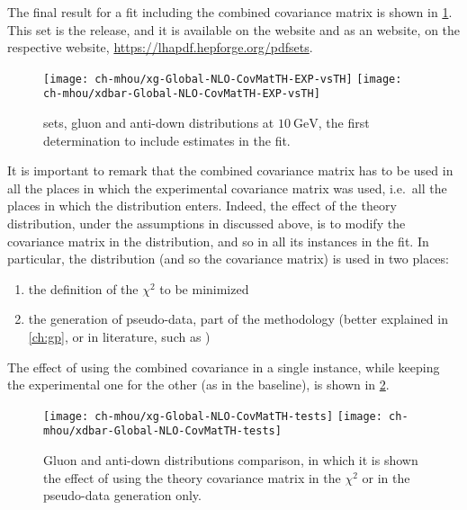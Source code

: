 The final result for a fit including the combined covariance matrix is shown in
\cref{fig:mhou/3.1th}.
%
This set is the  release, and it is available on the
\nnpdf website and as an \lhapdf website, on the respective website,
\url{https://lhapdf.hepforge.org/pdfsets}.

\begin{figure}
	\centering
	\texttt{[image: ch-mhou/xg-Global-NLO-CovMatTH-EXP-vsTH]}
	\texttt{[image: ch-mhou/xdbar-Global-NLO-CovMatTH-EXP-vsTH]}
	\caption{
		 \nlo sets, gluon and anti-down distributions at
		$\SI{10}{\giga\electronvolt}$, the first \pdf determination to include
		\mhou estimates in the fit.
	}
	\label{fig:mhou/3.1th}
\end{figure}

It is important to remark that the combined covariance matrix has to be used in
all the places in which the experimental covariance matrix was used, i.e.\ all
the places in which the distribution enters.
%
Indeed, the effect of the theory distribution, under the assumptions in
\cite{NNPDF:2019ubu} discussed above, is to modify the covariance matrix in the
distribution, and so in all its instances in the \pdf fit.
%
In particular, the distribution (and so the covariance matrix) is used in two
places:
\begin{enumerate}[label=\roman*.]
  \item the definition of the $\chi^2$ to be minimized
  \item the generation of pseudo-data, part of the \nnpdf methodology (better
    explained in \cref{ch:gp}, or in \nnpdf literature, such as
    \cite{Ball:2008by})
\end{enumerate}
%
The effect of using the combined covariance in a single instance, while keeping
the experimental one for the other (as in the baseline), is shown in
\cref{fig:mhou/3.1th-tests}.

\begin{figure}
	\centering
	\texttt{[image: ch-mhou/xg-Global-NLO-CovMatTH-tests]}
	\texttt{[image: ch-mhou/xdbar-Global-NLO-CovMatTH-tests]}
	\caption{
		Gluon and anti-down distributions comparison, in which it is shown the
		effect of using the theory covariance matrix in the $\chi^2$ or in the
		pseudo-data generation only.
	}
	\label{fig:mhou/3.1th-tests}
\end{figure}
